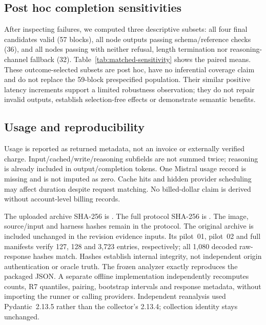 \begin{revision}
\subsection{Post hoc completion sensitivities}
After inspecting failures, we computed three descriptive subsets: all four
final candidates valid (57 blocks), all node outputs passing schema/reference
checks (36), and all nodes passing with neither refusal, length termination
nor reasoning-channel fallback (32). Table~\ref{tab:matched-sensitivity}
shows the paired means. These outcome-selected subsets are post hoc, have
no inferential coverage claim and do not replace the 59-block prespecified
population. Their similar positive latency increments support a limited
robustness observation; they do not repair invalid outputs, establish
selection-free effects or demonstrate semantic benefits.

\subsection{Usage and reproducibility}
Usage is reported as returned metadata, not an invoice or externally
verified charge. Input/cached/write/reasoning subfields are not summed twice;
reasoning is already included in output/completion tokens. One Mistral usage
record is missing and is not imputed as zero. Cache hits and hidden provider
scheduling may affect duration despite request matching. No billed-dollar
claim is derived without account-level billing records.

The uploaded archive SHA-256 is
.
The full protocol SHA-256 is
.
The image, source/input and harness hashes remain in the protocol.
The original archive is included unchanged in the revision evidence inputs.
Its pilot~01, pilot~02 and full manifests verify 127, 128 and 3,723 entries,
respectively; all 1,080 decoded raw-response hashes match. Hashes establish
internal integrity, not independent origin authentication or oracle truth.
The frozen analyzer exactly reproduces the packaged JSON. A separate offline
implementation independently recomputes counts, R7 quantiles, pairing,
bootstrap intervals and response metadata, without importing the runner or
calling providers. Independent reanalysis used Pydantic~2.13.5 rather than
the collector's 2.13.4; collection identity stays unchanged.


\end{revision}
